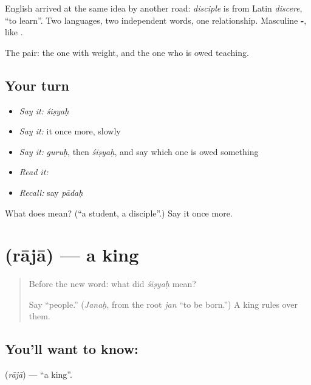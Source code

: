 English arrived at the same idea by another road: \emph{disciple} is from Latin \emph{discere}, \textquotedblleft{}to learn\textquotedblright{}. Two languages, two independent words, one relationship. Masculine \textbf{-}, like .

\begin{grammarlens}[title={What you've built}]
The pair: the one with weight, and the one who is owed teaching.
\end{grammarlens}

\subsection*{Your turn}
\begin{itemize}
\raggedright
  \item \emph{Say it:} \emph{śiṣyaḥ}
  \item \emph{Say it:} it once more, slowly
  \item \emph{Say it:} \emph{guruḥ}, then \emph{śiṣyaḥ}, and say which one is owed something
  \item \emph{Read it:} \textbf{}
  \item \emph{Recall:} say \emph{pādaḥ}
\end{itemize}

\begin{tcolorbox}[breakable,colback=teal!4,colframe=teal!35!black,title={Before you move on}]
What does  mean? (\textquotedblleft{}a student, a disciple\textquotedblright{}.) Say it once more.
\end{tcolorbox}
\section[\texorpdfstring{\sk{राजा} (rājā)}{राजा (rājā)}]{ (rājā) — a king}

\label{lesson:SA-C26-king}



\begin{quote}
Before the new word: what did \emph{śiṣyaḥ} mean?

Say \textquotedblleft{}people.\textquotedblright{} (\emph{Janaḥ}, from the root \emph{jan} \textquotedblleft{}to be born.\textquotedblright{}) A king rules over them.
\end{quote}

\subsection*{You'll want to know: }
\textbf{} (\emph{rājā}) — \textquotedblleft{}a king\textquotedblright{}.

